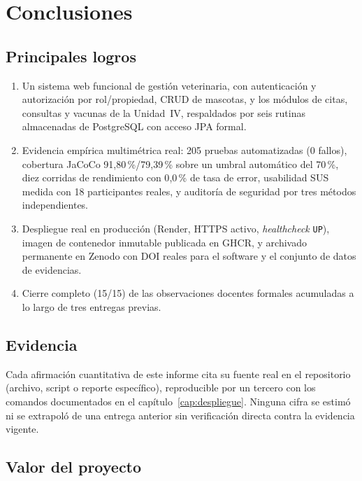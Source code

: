 \chapter{Conclusiones}
\label{cap:conclusiones-final}

\section{Principales logros}

\begin{enumerate}[nosep]
  \item Un sistema web funcional de gesti\'on veterinaria, con
    autenticaci\'on y autorizaci\'on por rol/propiedad, CRUD de mascotas, y
    los m\'odulos de citas, consultas y vacunas de la Unidad~IV,
    respaldados por seis rutinas almacenadas de PostgreSQL con acceso JPA
    formal.
  \item Evidencia emp\'irica multim\'etrica real: 205 pruebas
    automatizadas (0 fallos), cobertura JaCoCo 91{,}80\,\%/79{,}39\,\% sobre
    un umbral autom\'atico del 70\,\%, diez corridas de rendimiento con
    0{,}0\,\% de tasa de error, usabilidad SUS medida con 18 participantes
    reales, y auditor\'ia de seguridad por tres m\'etodos independientes.
  \item Despliegue real en producci\'on (Render, HTTPS activo,
    \emph{healthcheck} \texttt{UP}), imagen de contenedor inmutable
    publicada en GHCR, y archivado permanente en Zenodo con DOI reales
    para el software y el conjunto de datos de evidencias.
  \item Cierre completo (15/15) de las observaciones docentes formales
    acumuladas a lo largo de tres entregas previas.
\end{enumerate}

\section{Evidencia}

Cada afirmaci\'on cuantitativa de este informe cita su fuente real en el
repositorio (archivo, script o reporte espec\'ifico), reproducible por un
tercero con los comandos documentados en el
cap\'itulo~\ref{cap:despliegue}. Ninguna cifra se estim\'o ni se
extrapol\'o de una entrega anterior sin verificaci\'on directa contra la
evidencia vigente.

\section{Valor del proyecto}

